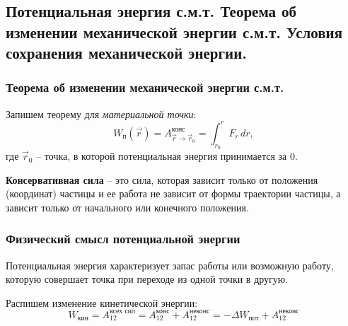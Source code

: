\subsection{Потенциальная энергия с.м.т. \textbf{Теорема об изменении механической энергии с.м.т. Условия сохранения механической энергии.}}

\subsubsection*{Теорема об изменении механической энергии с.м.т.}
Запишем теорему для \textit{материальной точки}:
\[W_{\text{п}}(\vec{r}) = A_{\vec{r} \to \vec{r}_0}^{\text{конс}} = \int_{r_0}^{r} F_r \, dr,\]
где $\vec{r}_0$ -- точка, в которой потенциальная энергия принимается за $0$.

\textbf{Консервативная сила} -- это сила, которая зависит только от положения (координат) частицы и ее работа не зависит от формы траектории частицы, а зависит только от начального или конечного положения.


\subsubsection*{Физический смысл потенциальной энергии}
Потенциальная энергия характеризует запас работы или возможную работу, которую совершает точка при переходе из одной точки в другую.



Распишем изменение кинетической энергии:
\[W_{\text{кин}} = A_{12}^{\text{всех сил}} = A_{12}^{\text{конс}} + A_{12}^{\text{неконс}} = -\Delta W_{\text{пот}} + A_{12}^{\text{неконс}}\]